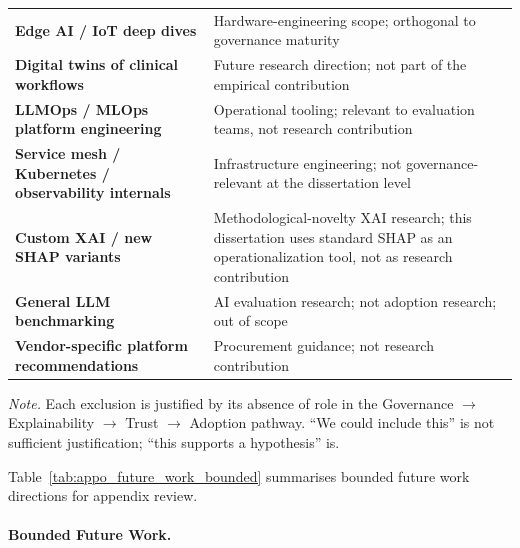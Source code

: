 {\begin{xltabular}{\textwidth}{@{} >{\raggedright\arraybackslash}p{3.0cm} L @{}}
\textbf{Edge AI / IoT deep dives}                 & Hardware-engineering scope; orthogonal to governance maturity \\
\textbf{Digital twins of clinical workflows}      & Future research direction; not part of the empirical contribution \\
\textbf{LLMOps / MLOps platform engineering}      & Operational tooling; relevant to evaluation teams, not research contribution \\
\textbf{Service mesh / Kubernetes / observability internals} & Infrastructure engineering; not governance-relevant at the dissertation level \\
\textbf{Custom XAI / new SHAP variants}           & Methodological-novelty XAI research; this dissertation uses standard SHAP as an operationalization tool, not as research contribution \\
\textbf{General LLM benchmarking}                 & AI evaluation research; not adoption research; out of scope \\
\textbf{Vendor-specific platform recommendations} & Procurement guidance; not research contribution \\
\end{xltabular}}
\vspace{0.4em}
\noindent\textit{Note.} Each exclusion is justified by its absence of role in the Governance $\to$ Explainability $\to$ Trust $\to$ Adoption pathway. ``We could include this'' is not sufficient justification; ``this supports a hypothesis'' is.

\noindent Table~\ref{tab:appo_future_work_bounded} summarises bounded future work directions for appendix review.

\paragraph{Bounded Future Work.}




